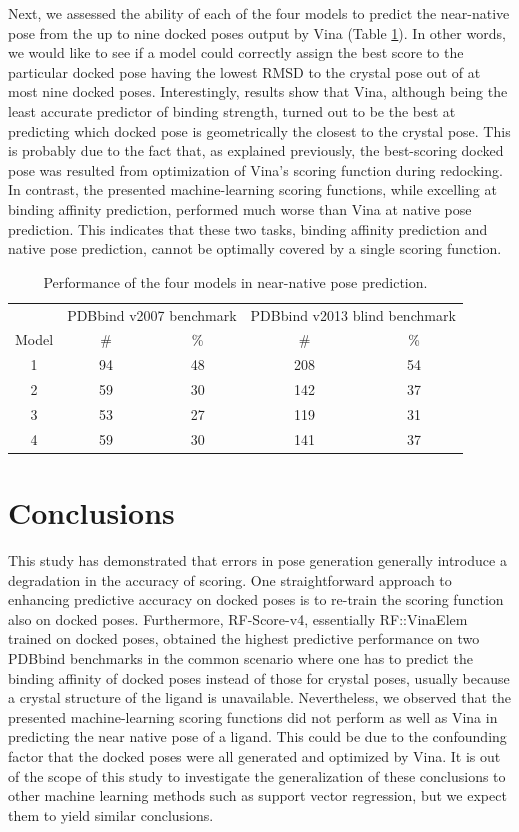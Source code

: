 Next, we assessed the ability of each of the four models to predict the near-native pose from the up to nine docked poses output by Vina (Table \ref{rfscore4:near-native}). In other words, we would like to see if a model could correctly assign the best score to the particular docked pose having the lowest RMSD to the crystal pose out of at most nine docked poses. Interestingly, results show that Vina, although being the least accurate predictor of binding strength, turned out to be the best at predicting which docked pose is geometrically the closest to the crystal pose. This is probably due to the fact that, as explained previously, the best-scoring docked pose was resulted from optimization of Vina's scoring function during redocking. In contrast, the presented machine-learning scoring functions, while excelling at binding affinity prediction, performed much worse than Vina at native pose prediction. This indicates that these two tasks, binding affinity prediction and native pose prediction, cannot be optimally covered by a single scoring function.

\begin{table}
\caption{Performance of the four models in near-native pose prediction.}
\label{rfscore4:near-native}
\begin{tabular}{ccccc}
\hline
& \multicolumn{2}{c}{PDBbind v2007 benchmark} & \multicolumn{2}{c}{PDBbind v2013 blind benchmark}\\
Model & \# & \% & \# & \%\\
\hline
1 & 94 & 48 & 208 & 54\\
2 & 59 & 30 & 142 & 37\\
3 & 53 & 27 & 119 & 31\\
4 & 59 & 30 & 141 & 37\\
\hline
\end{tabular}
\end{table}

\section{Conclusions}

This study has demonstrated that errors in pose generation generally introduce a degradation in the accuracy of scoring. One straightforward approach to enhancing predictive accuracy on docked poses is to re-train the scoring function also on docked poses. Furthermore, RF-Score-v4, essentially RF::VinaElem trained on docked poses, obtained the highest predictive performance on two PDBbind benchmarks in the common scenario where one has to predict the binding affinity of docked poses instead of those for crystal poses, usually because a crystal structure of the ligand is unavailable. Nevertheless, we observed that the presented machine-learning scoring functions did not perform as well as Vina in predicting the near native pose of a ligand. This could be due to the confounding factor that the docked poses were all generated and optimized by Vina. It is out of the scope of this study to investigate the generalization of these conclusions to other machine learning methods such as support vector regression, but we expect them to yield similar conclusions.

